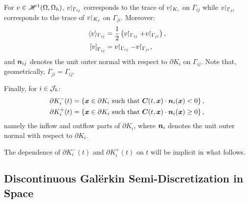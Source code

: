 For $v \in \mathscr{H}^{1}(\Omega, \Omega_h)$, $v \!\!\restriction_{\Gamma_{ij}}$ corresponds to the trace of $v \!\!\restriction_{K_i}$ on $\Gamma_{ij}$ while $v \!\!\restriction_{\Gamma_{ji}}$ corresponds to the trace of $v \!\!\restriction_{K_j}$ on $\Gamma_{ji}$. Moreover:
\begin{align}
    \langle v \rangle_{\Gamma_{ij}} &= \frac{1}{2} \left( v \Restriction_{\Gamma_{ij}} + v \Restriction_{\Gamma_{ji}} \right), \\
    \left[ v \right]_{\Gamma_{ij}} &= v \Restriction_{\Gamma_{ij}} - v \Restriction_{\Gamma_{ji}},
\end{align}
and $\bm{n}_{ij}$ denotes the unit outer normal with respect to $\partial K_i$ on $\Gamma_{ij}$. Note that, geometrically, $\Gamma_{ji} = \Gamma_{ij}$.

Finally, for $i \in \mathcal{J}_h$:
\begin{align}
    \partial K_i^-(t) = \left\{ \bm{x} \in \partial K_i \text{ such that } \bm{C}(t, \bm{x}) \cdot \bm{n}_i(\bm{x}) < 0 \right\}, \\
    \partial K_i^+(t) = \left\{ \bm{x} \in \partial K_i \text{ such that } \bm{C}(t, \bm{x}) \cdot \bm{n}_i(\bm{x}) \geq 0 \right\},
\end{align}
namely the inflow and outflow parts of $\partial K_i$, where $\bm{n}_i$ denotes the unit outer normal with respect to $\partial K_i$.

The dependence of $\partial K_i^-(t)$ and $\partial K_i^+(t)$ on $t$ will be implicit in what follows.

\newpage
\subsection{Discontinuous Galërkin Semi-Discretization in Space} \label{sec:space_discretization}

